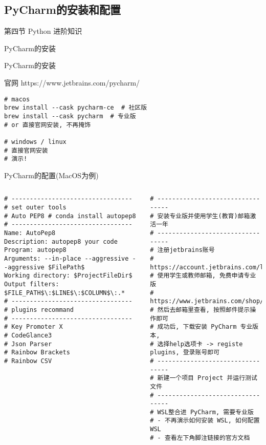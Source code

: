 \subsection{PyCharm的安装和配置}
\begin{frame}[standout] 第四节 \quad Python 进阶知识 \end{frame}
\begin{frame}[standout] PyCharm的安装 \end{frame}
\begin{frame}[fragile]{PyCharm的安装}
    \begin{myoutline}
        \1 官网 https://www.jetbrains.com/pycharm/
    \end{myoutline}

    \begin{lstlisting}
# macos
brew install --cask pycharm-ce  # 社区版
brew install --cask pycharm  # 专业版
# or 直接官网安装, 不再掩饰

# windows / linux
# 直接官网安装
# 演示!
    \end{lstlisting}
    
\end{frame}

\begin{frame}[fragile]{PyCharm的配置(MacOS为例)}
    \begin{columns}
        \begin{lstlisting}
# ---------------------------------
# set outer tools
# Auto PEP8 # conda install autopep8 
# ---------------------------------
Name: AutoPep8
Description: autopep8 your code
Program: autopep8
Arguments: --in-place --aggressive --aggressive $FilePath$
Working directory: $ProjectFileDir$
Output filters: $FILE_PATH$\:$LINE$\:$COLUMN$\:.*
# ---------------------------------
# plugins recommand
# ---------------------------------
# Key Promoter X
# CodeGlance3
# Json Parser
# Rainbow Brackets
# Rainbow CSV
        \end{lstlisting}
        \begin{lstlisting}
# ---------------------------------
# 安装专业版并使用学生(教育)邮箱激活一年
# ---------------------------------
# 注册jetbrains账号
# https://account.jetbrains.com/login
# 使用学生或教师邮箱, 免费申请专业版
# https://www.jetbrains.com/shop/eform/students/
# 然后去邮箱里查看, 按照邮件提示操作即可
# 成功后, 下载安装 PyCharm 专业版本, 
# 选择help选项卡 -> registe plugins, 登录账号即可
# ---------------------------------
# 新建一个项目 Project 并运行测试文件
# ---------------------------------
# WSL整合进 PyCharm, 需要专业版
# - 不再演示如何安装 WSL, 如何配置 WSL
# - 查看左下角脚注链接的官方文档
        \end{lstlisting}
    \end{columns}
\end{frame}


